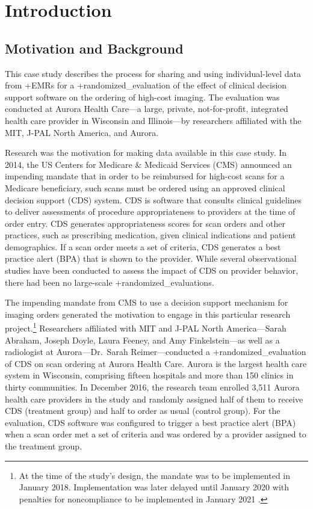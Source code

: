 \documentclass[
]{book}
\begin{document}
\hypertarget{introduction-5}{%
\section{Introduction}\label{introduction-5}}

\hypertarget{motivation-and-background-4}{%
\subsection{Motivation and Background}\label{motivation-and-background-4}}

This case study describes the process for sharing and using individual-level data from +EMRs\textbar{} for a +randomized\_evaluation\textbar{} of the effect of clinical decision support software on the ordering of high-cost imaging. The evaluation was conducted at Aurora Health Care---a large, private, not-for-profit, integrated health care provider in Wisconsin and Illinois---by researchers affiliated with the MIT, J-PAL North America, and Aurora.

Research was the motivation for making data available in this case study. In 2014, the US Centers for Medicare \& Medicaid Services (CMS) announced an impending mandate that in order to be reimbursed for high-cost scans for a Medicare beneficiary, such scans must be ordered using an approved clinical decision support (CDS) system. CDS is software that consults clinical guidelines to deliver assessments of procedure appropriateness to providers at the time of order entry. CDS generates appropriateness scores for scan orders and other practices, such as prescribing medication, given clinical indications and patient demographics. If a scan order meets a set of criteria, CDS generates a best practice alert (BPA) that is shown to the provider. While several observational studies have been conducted to assess the impact of CDS on provider behavior, there had been no large-scale +randomized\_evaluations\textbar.

The impending mandate from CMS to use a decision support mechanism for imaging orders generated the motivation to engage in this particular research project.\footnote{At the time of the study's design, the mandate was to be implemented in January 2018. Implementation was later delayed until January 2020 with penalties for noncompliance to be implemented in January 2021 \citep{hentel2019, centersformedicaremedicaidservices2018}.} Researchers affiliated with MIT and J-PAL North America---Sarah Abraham, Joseph Doyle, Laura Feeney, and Amy Finkelstein---as well as a radiologist at Aurora---Dr.~Sarah Reimer---conducted a +randomized\_evaluation\textbar{} of CDS on scan ordering at Aurora Health Care. Aurora is the largest health care system in Wisconsin, comprising fifteen hospitals and more than 150 clinics in thirty communities. In December 2016, the research team enrolled 3,511 Aurora health care providers in the study and randomly assigned half of them to receive CDS (treatment group) and half to order as usual (control group). For the evaluation, CDS software was configured to trigger a best practice alert (BPA) when a scan order met a set of criteria and was ordered by a provider assigned to the treatment group.
\end{document}

